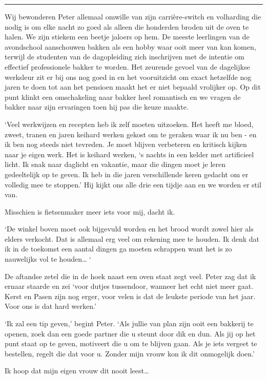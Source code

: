 \documentclass[
  11pt,
  dutch,
]{memoir}
\begin{document}
\pfbreak

Wij bewonderen Peter allemaal omwille van zijn carrière-switch en
volharding die nodig is om elke nacht zo goed als alleen die honderden
broden uit de oven te halen. We zijn stiekem een beetje jaloers op hem.
De meeste leerlingen van de avondschool aanschouwen bakken als een hobby
waar ooit meer van kan komen, terwijl de studenten van de dagopleiding
zich inschrijven met de intentie om effectief professionele bakker te
worden. Het zeurende gevoel van de dagelijkse werksleur zit er bij ons
nog goed in en het vooruitzicht om exact hetzelfde nog jaren te doen tot
aan het pensioen maakt het er niet bepaald vrolijker op. Op dit punt
klinkt een omschakeling naar bakker heel romantisch en we vragen de
bakker naar zijn ervaringen toen hij pas die keuze maakte.

`Veel werkwijzen en recepten heb ik zelf moeten uitzoeken. Het heeft me
bloed, zweet, tranen en jaren keihard werken gekost om te geraken waar
ik nu ben - en ik ben nog steeds niet tevreden. Je moet blijven
verbeteren en kritisch kijken naar je eigen werk. Het is keihard werken,
`s nachts in een kelder met artificieel licht. Ik snak naar daglicht en
vakantie, maar die dingen moet je leren gedeeltelijk op te geven. Ik heb
in die jaren verschillende keren gedacht om er volledig mee te stoppen.'
Hij kijkt ons alle drie een tijdje aan en we worden er stil van.

Misschien is fietsenmaker meer iets voor mij, dacht ik.

`De winkel boven moet ook bijgevuld worden en het brood wordt zowel hier
als elders verkocht. Dat is allemaal erg veel om rekening mee te houden.
Ik denk dat ik in de toekomst een aantal dingen ga moeten schrappen want
het is zo nauwelijks vol te houden\ldots{} `

De aftandse zetel die in de hoek naast een oven staat zegt veel. Peter
zag dat ik ernaar staarde en zei `voor dutjes tussendoor, wanneer het
echt niet meer gaat. Kerst en Pasen zijn nog erger, voor velen is dat de
leukste periode van het jaar. Voor ons is dat hard werken.'

`Ik zal een tip geven,' begint Peter. `Als jullie van plan zijn ooit een
bakkerij te openen, zoek dan een goede partner die u steunt door dik en
dun. Als jij op het punt staat op te geven, motiveert die u om te
blijven gaan. Als je iets vergeet te bestellen, regelt die dat voor u.
Zonder mijn vrouw kon ik dit onmogelijk doen.'

Ik hoop dat mijn eigen vrouw dit nooit leest\ldots{}
\end{document}
